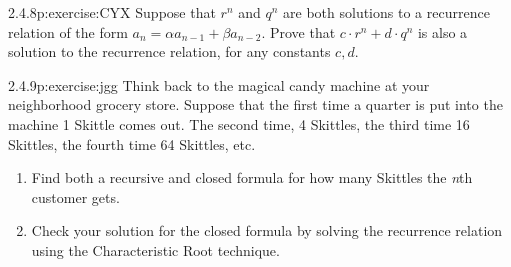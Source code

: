 \documentclass[twoside,11pt,]{book}
\numberwithin{equation}{chapter}
\begin{document}
\begin{divisionsolution}{2.4.8}{}{p:exercise:CYX}%
Suppose that \(r^n\) and \(q^n\) are both solutions to a recurrence relation of the form \(a_n = \alpha a_{n-1} + \beta a_{n-2}\). Prove that \(c\cdot r^n + d \cdot q^n\) is also a solution to the recurrence relation, for any constants \(c, d\).%
\end{divisionsolution}%
\begin{divisionsolution}{2.4.9}{}{p:exercise:jgg}%
Think back to the magical candy machine at your neighborhood grocery store. Suppose that the first time a quarter is put into the machine 1 Skittle comes out. The second time, 4 Skittles, the third time 16 Skittles, the fourth time 64 Skittles, etc.%
\begin{enumerate}[label=(\alph*)]
\item{}Find both a recursive and closed formula for how many Skittles the \emph{n}th customer gets.%
\item{}Check your solution for the closed formula by solving the recurrence relation using the Characteristic Root technique.%
\end{enumerate}
%
\end{divisionsolution}%
\end{document}
